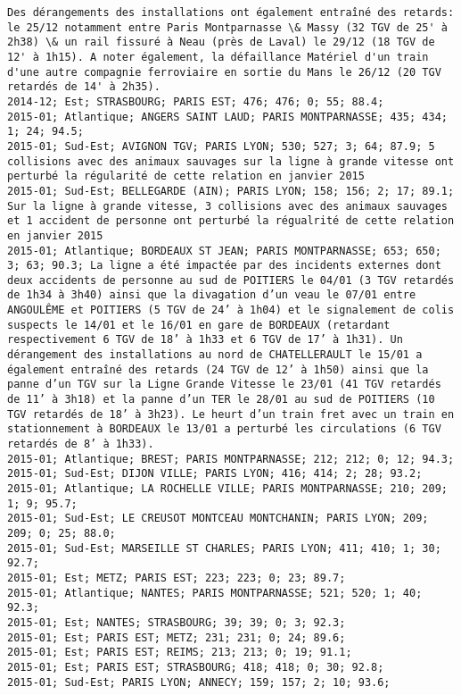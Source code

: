 \documentclass{article}
\begin{document}
\begin{Verbatim}[commandchars=\\\{\}]
Des dérangements des installations ont également entraîné des retards: le 25/12 notamment entre Paris Montparnasse \& Massy (32 TGV de 25' à 2h38) \& un rail fissuré à Neau (près de Laval) le 29/12 (18 TGV de 12' à 1h15). A noter également, la défaillance Matériel d'un train d'une autre compagnie ferroviaire en sortie du Mans le 26/12 (20 TGV retardés de 14' à 2h35). 
2014-12; Est; STRASBOURG; PARIS EST; 476; 476; 0; 55; 88.4; 
2015-01; Atlantique; ANGERS SAINT LAUD; PARIS MONTPARNASSE; 435; 434; 1; 24; 94.5; 
2015-01; Sud-Est; AVIGNON TGV; PARIS LYON; 530; 527; 3; 64; 87.9; 5 collisions avec des animaux sauvages sur la ligne à grande vitesse ont perturbé la régularité de cette relation en janvier 2015
2015-01; Sud-Est; BELLEGARDE (AIN); PARIS LYON; 158; 156; 2; 17; 89.1; Sur la ligne à grande vitesse, 3 collisions avec des animaux sauvages et 1 accident de personne ont perturbé la régualrité de cette relation en janvier 2015
2015-01; Atlantique; BORDEAUX ST JEAN; PARIS MONTPARNASSE; 653; 650; 3; 63; 90.3; La ligne a été impactée par des incidents externes dont deux accidents de personne au sud de POITIERS le 04/01 (3 TGV retardés de 1h34 à 3h40) ainsi que la divagation d’un veau le 07/01 entre ANGOULÊME et POITIERS (5 TGV de 24’ à 1h04) et le signalement de colis suspects le 14/01 et le 16/01 en gare de BORDEAUX (retardant respectivement 6 TGV de 18’ à 1h33 et 6 TGV de 17’ à 1h31). Un dérangement des installations au nord de CHATELLERAULT le 15/01 a également entraîné des retards (24 TGV de 12’ à 1h50) ainsi que la panne d’un TGV sur la Ligne Grande Vitesse le 23/01 (41 TGV retardés de 11’ à 3h18) et la panne d’un TER le 28/01 au sud de POITIERS (10 TGV retardés de 18’ à 3h23). Le heurt d’un train fret avec un train en stationnement à BORDEAUX le 13/01 a perturbé les circulations (6 TGV retardés de 8’ à 1h33).
2015-01; Atlantique; BREST; PARIS MONTPARNASSE; 212; 212; 0; 12; 94.3; 
2015-01; Sud-Est; DIJON VILLE; PARIS LYON; 416; 414; 2; 28; 93.2; 
2015-01; Atlantique; LA ROCHELLE VILLE; PARIS MONTPARNASSE; 210; 209; 1; 9; 95.7; 
2015-01; Sud-Est; LE CREUSOT MONTCEAU MONTCHANIN; PARIS LYON; 209; 209; 0; 25; 88.0; 
2015-01; Sud-Est; MARSEILLE ST CHARLES; PARIS LYON; 411; 410; 1; 30; 92.7; 
2015-01; Est; METZ; PARIS EST; 223; 223; 0; 23; 89.7; 
2015-01; Atlantique; NANTES; PARIS MONTPARNASSE; 521; 520; 1; 40; 92.3; 
2015-01; Est; NANTES; STRASBOURG; 39; 39; 0; 3; 92.3; 
2015-01; Est; PARIS EST; METZ; 231; 231; 0; 24; 89.6; 
2015-01; Est; PARIS EST; REIMS; 213; 213; 0; 19; 91.1; 
2015-01; Est; PARIS EST; STRASBOURG; 418; 418; 0; 30; 92.8; 
2015-01; Sud-Est; PARIS LYON; ANNECY; 159; 157; 2; 10; 93.6; 

\end{Verbatim}
\end{document}
